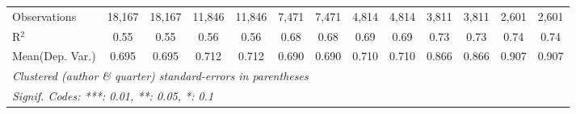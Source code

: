 \begin{tabular}{lcccccccccccc}
   Observations                             & 18,167         & 18,167       & 11,846        & 11,846      & 7,471         & 7,471       & 4,814        & 4,814       & 3,811   & 3,811    & 2,601   & 2,601\\  
   R$^2$                                    & 0.55           & 0.55         & 0.56          & 0.56        & 0.68          & 0.68        & 0.69         & 0.69        & 0.73    & 0.73     & 0.74    & 0.74\\  
Mean(Dep. Var.) & 0.695 & 0.695 & 0.712 & 0.712 & 0.690 & 0.690 & 0.710 & 0.710 & 0.866 & 0.866 & 0.907 & 0.907 \\
   \midrule \midrule
   \multicolumn{13}{l}{\emph{Clustered (author \& quarter) standard-errors in parentheses}}\\
   \multicolumn{13}{l}{\emph{Signif. Codes: ***: 0.01, **: 0.05, *: 0.1}}\\
\end{tabular}
\par\endgroup
